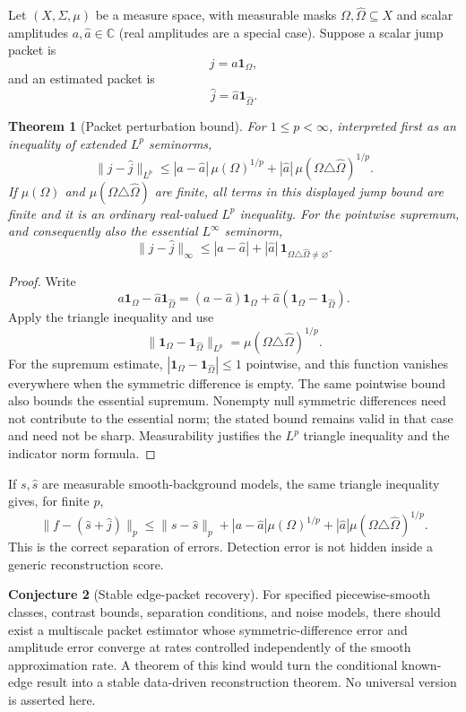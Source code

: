 \documentclass[11pt,a4paper]{article}
\newtheorem{theorem}{Theorem}[section]
\theoremstyle{definition}
\newtheorem{conjecture}[theorem]{Conjecture}
\theoremstyle{remark}
\newcommand{\bbC}{\mathbb C}
\begin{document}
Let $(X,\Sigma,\mu)$ be a measure space, with measurable masks $\Omega,\widehat\Omega\subseteq X$ and scalar amplitudes $a,\widehat a\in\bbC$ (real amplitudes are a special case). Suppose a scalar jump packet is
\[
j=a\mathbf 1_{\Omega},
\]
and an estimated packet is
\[
\widehat j=\widehat a\mathbf 1_{\widehat\Omega}.
\]

\begin{theorem}[Packet perturbation bound]\label{result:12}
For $1\le p<\infty$, interpreted first as an inequality of extended $L^p$ seminorms,
\[
\boxed{
\|j-\widehat j\|_{L^p}
\le
|a-\widehat a|\,\mu(\Omega)^{1/p}
+
|\widehat a|\,\mu(\Omega\triangle\widehat\Omega)^{1/p}.
}
\]
If $\mu(\Omega)$ and $\mu(\Omega\triangle\widehat\Omega)$ are finite, all terms in this displayed jump bound are finite and it is an ordinary real-valued $L^p$ inequality. For the pointwise supremum, and consequently also the essential $L^\infty$ seminorm,
\[
\|j-\widehat j\|_{\infty}
\le |a-\widehat a|+|\widehat a|\,
\mathbf 1_{\Omega\triangle\widehat\Omega\ne\varnothing}.
\]
\end{theorem}

\begin{proof}
Write
\[
a\mathbf 1_{\Omega}-\widehat a\mathbf 1_{\widehat\Omega}
=(a-\widehat a)\mathbf 1_{\Omega}
+\widehat a(\mathbf 1_{\Omega}-\mathbf 1_{\widehat\Omega}).
\]
Apply the triangle inequality and use
\[
\|\mathbf 1_{\Omega}-\mathbf 1_{\widehat\Omega}\|_{L^p}
=\mu(\Omega\triangle\widehat\Omega)^{1/p}.
\]
For the supremum estimate, $|\mathbf1_\Omega-\mathbf1_{\widehat\Omega}|\le1$ pointwise, and this function vanishes everywhere when the symmetric difference is empty. The same pointwise bound also bounds the essential supremum. Nonempty null symmetric differences need not contribute to the essential norm; the stated bound remains valid in that case and need not be sharp. Measurability justifies the $L^p$ triangle inequality and the indicator norm formula.
\end{proof}

If $s,\widehat s$ are measurable smooth-background models, the same triangle inequality gives, for finite $p$,
\[
\boxed{
\|f-(\widehat s+\widehat j)\|_p
\le
\|s-\widehat s\|_p
+|a-\widehat a|\mu(\Omega)^{1/p}
+|\widehat a|\mu(\Omega\triangle\widehat\Omega)^{1/p}.
}
\]
This is the correct separation of errors. Detection error is not hidden inside a generic reconstruction score.

\begin{conjecture}[Stable edge-packet recovery]\label{core:record:17}
For specified piecewise-smooth classes, contrast bounds, separation conditions, and noise models, there should exist a multiscale packet estimator whose symmetric-difference error and amplitude error converge at rates controlled independently of the smooth approximation rate. A theorem of this kind would turn the conditional known-edge result into a stable data-driven reconstruction theorem. No universal version is asserted here.
\end{conjecture}
\end{document}

